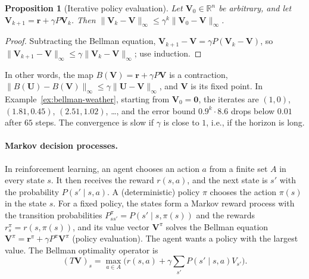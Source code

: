 \documentclass[11pt]{article}
\newcommand{\norm}[1]{\lVert #1 \rVert}
\theoremstyle{definition}
\theoremstyle{plain}
\newtheorem{proposition}[definition]{Proposition}
\theoremstyle{remark}
\begin{document}
\begin{proposition}[Iterative policy evaluation]\label{prop:policy-evaluation}
    Let $\mathbf{V}_0 \in \mathbb{R}^n$ be arbitrary, and let $\mathbf{V}_{k+1} = \mathbf{r} + \gamma P\mathbf{V}_k$. Then $\norm{\mathbf{V}_k - \mathbf{V}}_\infty \leq \gamma^k\norm{\mathbf{V}_0 - \mathbf{V}}_\infty$.
\end{proposition}

\begin{proof}
    Subtracting the Bellman equation, $\mathbf{V}_{k+1} - \mathbf{V} = \gamma P(\mathbf{V}_k - \mathbf{V})$, so $\norm{\mathbf{V}_{k+1} - \mathbf{V}}_\infty \leq \gamma\norm{\mathbf{V}_k - \mathbf{V}}_\infty$; use induction.
\end{proof}

In other words, the map $B(\mathbf{V}) = \mathbf{r} + \gamma P\mathbf{V}$ is a contraction, $\norm{B(\mathbf{U}) - B(\mathbf{V})}_\infty \leq \gamma\norm{\mathbf{U} - \mathbf{V}}_\infty$, and $\mathbf{V}$ is its fixed point. In Example~\ref{ex:bellman-weather}, starting from $\mathbf{V}_0 = \mathbf{0}$, the iterates are $(1, 0)$, $(1.81, 0.45)$, $(2.51, 1.02)$, \ldots, and the error bound $0.9^k \cdot 8.6$ drops below $0.01$ after $65$ steps. The convergence is slow if $\gamma$ is close to $1$, i.e., if the horizon is long.

\paragraph{Markov decision processes.} In reinforcement learning, an agent chooses an action $a$ from a finite set $A$ in every state $s$. It then receives the reward $r(s, a)$, and the next state is $s'$ with the probability $P(s' \mid s, a)$. A (deterministic) policy $\pi$ chooses the action $\pi(s)$ in the state $s$. For a fixed policy, the states form a Markov reward process with the transition probabilities $P^\pi_{ss'} = P(s' \mid s, \pi(s))$ and the rewards $r^\pi_s = r(s, \pi(s))$, and its value vector $\mathbf{V}^\pi$ solves the Bellman equation $\mathbf{V}^\pi = \mathbf{r}^\pi + \gamma P^\pi\mathbf{V}^\pi$ (policy evaluation). The agent wants a policy with the largest value. The Bellman optimality operator is
\[(T\mathbf{V})_s = \max_{a \in A}\Big(r(s, a) + \gamma\sum_{s'}P(s' \mid s, a)V_{s'}\Big).\]
\end{document}
